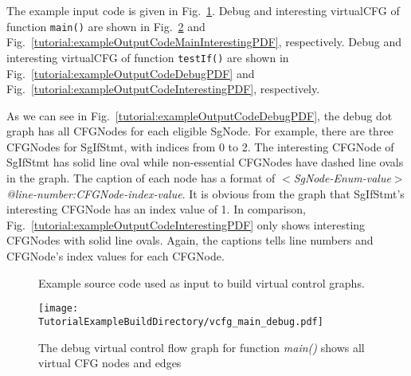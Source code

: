 The example input code is given in
Fig.~\ref{Tutorial:exampleInputCode_virtualCFG}. 
Debug and interesting virtualCFG of function \lstinline{main()}
are shown in Fig.~\ref{tutorial:exampleOutputCodeMainDebugPDF} and
Fig.~\ref{tutorial:exampleOutputCodeMainInterestingPDF}, respectively.
Debug and interesting virtualCFG of function \lstinline{testIf()}
are shown in Fig.~\ref{tutorial:exampleOutputCodeDebugPDF} and
Fig.~\ref{tutorial:exampleOutputCodeInterestingPDF}, respectively.

As we can see in Fig.~\ref{tutorial:exampleOutputCodeDebugPDF}, the debug
dot graph has all CFGNodes for each eligible SgNode. 
For example, there are three CFGNodes for SgIfStmt, with indices from 0 to
2. The interesting CFGNode of SgIfStmt has solid line oval while
non-essential CFGNodes have dashed line ovals in the graph. 
The caption of each node has a format of
\textit{$<$SgNode-Enum-value$>$@line-number:CFGNode-index-value}. 
It is obvious from the graph that SgIfStmt's interesting CFGNode has an index value of 1. 
In comparison, Fig.~\ref{tutorial:exampleOutputCodeInterestingPDF} only
shows interesting CFGNodes with solid line ovals. Again, the captions tells
line numbers and CFGNode's index values for each CFGNode. 

\begin{figure}%
{\indent
  {\mySmallFontSize
    \begin{latexonly}
    
    \end{latexonly}

    \begin{htmlonly}
    
    \end{htmlonly}

  }
}
\label{Tutorial:exampleInputCode_virtualCFG}
\caption{Example source code used as input to build virtual control graphs.}
\end{figure}

\begin{figure}
\texttt{[image: \\TutorialExampleBuildDirectory/vcfg\_main\_debug.pdf]}
\caption{The debug virtual control flow graph for function \textit{main()} shows all virtual CFG nodes
and edges}
\label{tutorial:exampleOutputCodeMainDebugPDF}
\end{figure}


